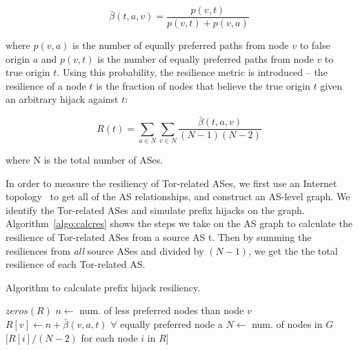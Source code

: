 \begin{equation}
\bar{\beta}(t,a,v) = \frac {p(v,t)} {p(v,t) + p(v,a)}
\end{equation}

where $p(v,a)$ is the number of equally preferred paths from node $v$ to false origin $a$ and $p(v,t)$ is the number of equally preferred paths from node $v$ to true origin $t$.  Using this probability, the resilience metric is introduced -- the resilience of a node $t$ is the fraction of nodes that believe the true origin $t$ given an arbitrary hijack against $t$:

\begin{equation}
R(t) = \sum_{a \in N} \sum_{v \in N} \frac {\bar{\beta}(t,a,v)} {(N-1)(N-2)}
\end{equation}

where N is the total number of ASes.

In order to measure the resiliency of Tor-related ASes, we first use an Internet topology~\cite{caida} to get all of the AS relationships, and construct an AS-level graph.  We identify the Tor-related ASes and simulate prefix hijacks on the graph. Algorithm~\ref{algo:calcres} shows the steps we take on the AS graph to calculate the resilience of Tor-related ASes from a source AS t. Then by summing the resiliences from \emph{all} source ASes and divided by $(N-1)$, we get the the total resilience of each Tor-related AS.



\begin{algorithm}
\caption{Algorithm to calculate prefix hijack resiliency.}
\label{algo:calcres}
\begin{algorithmic}
    \State {}
    \State $zeros(R)$
		\State $n \gets $ num. of less preferred nodes than node $v$
		\State $R[v] \gets n + \bar{\beta}(v,a,t)$ $\forall$ equally preferred node a
	\EndIf
    \EndFor
    \State $N \gets$ num. of nodes in $G$
    \State \Return $[R[i] / (N-2)$ for each node $i$ in $R]$
\EndFunction
\end{algorithmic}
\end{algorithm}


